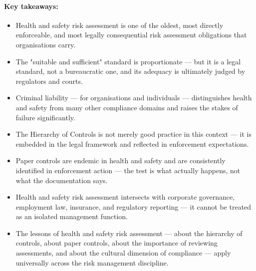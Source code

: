 \paragraph{Key takeaways:}
\begin{itemize}
  \item{Health and safety risk assessment is one of the oldest, most directly enforceable, and most legally consequential risk assessment obligations that organisations carry.}
  \item{The "suitable and sufficient" standard is proportionate — but it is a legal standard, not a bureaucratic one, and its adequacy is ultimately judged by regulators and courts.}
  \item{Criminal liability — for organisations and individuals — distinguishes health and safety from many other compliance domains and raises the stakes of failure significantly.}
  \item{The Hierarchy of Controls is not merely good practice in this context — it is embedded in the legal framework and reflected in enforcement expectations.}
  \item{Paper controls are endemic in health and safety and are consistently identified in enforcement action — the test is what actually happens, not what the documentation says.}
  \item{Health and safety risk assessment intersects with corporate governance, employment law, insurance, and regulatory reporting — it cannot be treated as an isolated management function.}
  \item{The lessons of health and safety risk assessment — about the hierarchy of controls, about paper controls, about the importance of reviewing assessments, and about the cultural dimension of compliance — apply universally across the risk management discipline.}
\end{itemize}

